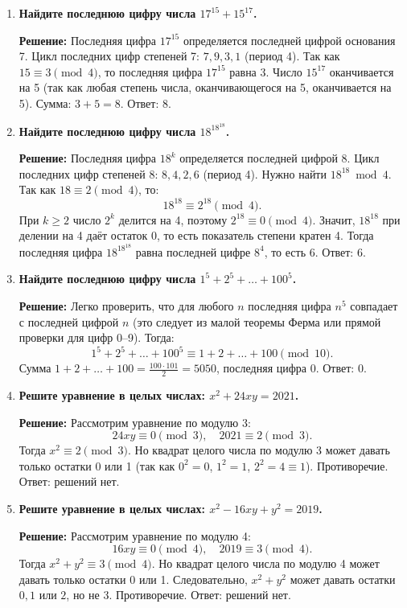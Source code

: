 \documentclass[12pt, a4paper]{article}
\begin{document}
\begin{enumerate}[label=\arabic*., wide=0pt, leftmargin=*]
\item \textbf{Найдите последнюю цифру числа \(17^{15} + 15^{17}\).}

\textbf{Решение:}
Последняя цифра \(17^{15}\) определяется последней цифрой основания 7. Цикл последних цифр степеней 7: \(7, 9, 3, 1\) (период 4). Так как \(15 \equiv 3 \pmod{4}\), то последняя цифра \(17^{15}\) равна 3.
Число \(15^{17}\) оканчивается на 5 (так как любая степень числа, оканчивающегося на 5, оканчивается на 5).
Сумма: \(3 + 5 = 8\).
Ответ: 8.

\item \textbf{Найдите последнюю цифру числа \(18^{18^{18}}\).}

\textbf{Решение:}
Последняя цифра \(18^k\) определяется последней цифрой 8. Цикл последних цифр степеней 8: \(8, 4, 2, 6\) (период 4). Нужно найти \(18^{18} \bmod 4\).
Так как \(18 \equiv 2 \pmod{4}\), то:
\[
18^{18} \equiv 2^{18} \pmod{4}.
\]
При \(k \ge 2\) число \(2^k\) делится на 4, поэтому \(2^{18} \equiv 0 \pmod{4}\).
Значит, \(18^{18}\) при делении на 4 даёт остаток 0, то есть показатель степени кратен 4. Тогда последняя цифра \(18^{18^{18}}\) равна последней цифре \(8^4\), то есть 6.
Ответ: 6.

\item \textbf{Найдите последнюю цифру числа \(1^5 + 2^5 + \dots + 100^5\).}

\textbf{Решение:}
Легко проверить, что для любого \(n\) последняя цифра \(n^5\) совпадает с последней цифрой \(n\) (это следует из малой теоремы Ферма или прямой проверки для цифр 0–9). Тогда:
\[
1^5 + 2^5 + \dots + 100^5 \equiv 1 + 2 + \dots + 100 \pmod{10}.
\]
Сумма \(1 + 2 + \dots + 100 = \frac{100 \cdot 101}{2} = 5050\), последняя цифра 0.
Ответ: 0.

\item \textbf{Решите уравнение в целых числах: \(x^2 + 24xy = 2021\).}

\textbf{Решение:}
Рассмотрим уравнение по модулю 3:
\[
24xy \equiv 0 \pmod{3},\quad 2021 \equiv 2 \pmod{3}.
\]
Тогда \(x^2 \equiv 2 \pmod{3}\). Но квадрат целого числа по модулю 3 может давать только остатки 0 или 1 (так как \(0^2=0\), \(1^2=1\), \(2^2=4 \equiv 1\)). Противоречие.
Ответ: решений нет.

\item \textbf{Решите уравнение в целых числах: \(x^2 - 16xy + y^2 = 2019\).}

\textbf{Решение:}
Рассмотрим уравнение по модулю 4:
\[
16xy \equiv 0 \pmod{4},\quad 2019 \equiv 3 \pmod{4}.
\]
Тогда \(x^2 + y^2 \equiv 3 \pmod{4}\). Но квадрат целого числа по модулю 4 может давать только остатки 0 или 1. Следовательно, \(x^2 + y^2\) может давать остатки \(0, 1\) или \(2\), но не 3. Противоречие.
Ответ: решений нет.


\end{enumerate}
\end{document}
